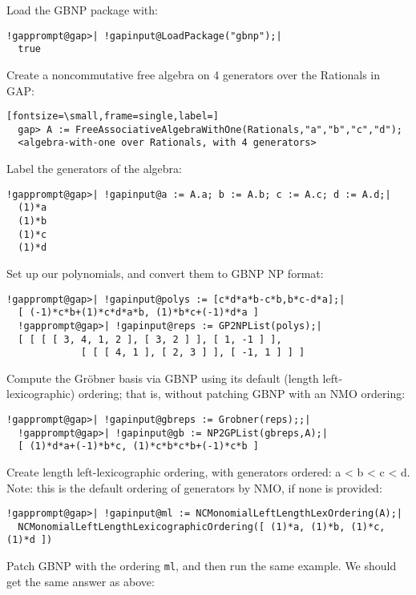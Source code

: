 \documentclass[a4paper,11pt]{report}
\begin{document}
{{{ Load the \textsf{GBNP} package with: 
\begin{Verbatim}[commandchars=!@|,fontsize=\small,frame=single,label=Example]
  !gapprompt@gap>| !gapinput@LoadPackage("gbnp");|
  true
\end{Verbatim}
 Create a noncommutative free algebra on 4 generators over the Rationals in \textsf{GAP}: 
\begin{Verbatim}[fontsize=\small,frame=single,label=]
  gap> A := FreeAssociativeAlgebraWithOne(Rationals,"a","b","c","d");
  <algebra-with-one over Rationals, with 4 generators> 
\end{Verbatim}
 Label the generators of the algebra: 
\begin{Verbatim}[commandchars=!@|,fontsize=\small,frame=single,label=Example]
  !gapprompt@gap>| !gapinput@a := A.a; b := A.b; c := A.c; d := A.d;|
  (1)*a
  (1)*b
  (1)*c
  (1)*d
\end{Verbatim}
 Set up our polynomials, and convert them to \textsf{GBNP} NP format: 
\begin{Verbatim}[commandchars=!@|,fontsize=\small,frame=single,label=Example]
  !gapprompt@gap>| !gapinput@polys := [c*d*a*b-c*b,b*c-d*a];|
  [ (-1)*c*b+(1)*c*d*a*b, (1)*b*c+(-1)*d*a ]
  !gapprompt@gap>| !gapinput@reps := GP2NPList(polys);|
  [ [ [ [ 3, 4, 1, 2 ], [ 3, 2 ] ], [ 1, -1 ] ],
             [ [ [ 4, 1 ], [ 2, 3 ] ], [ -1, 1 ] ] ]
\end{Verbatim}
 Compute the Gr{\"o}bner basis via \textsf{GBNP} using its default (length left-lexicographic) ordering; that is, without
patching \textsf{GBNP} with an \textsf{NMO} ordering: 
\begin{Verbatim}[commandchars=!@|,fontsize=\small,frame=single,label=Example]
  !gapprompt@gap>| !gapinput@gbreps := Grobner(reps);;|
  !gapprompt@gap>| !gapinput@gb := NP2GPList(gbreps,A);|
  [ (1)*d*a+(-1)*b*c, (1)*c*b*c*b+(-1)*c*b ]
\end{Verbatim}
 Create length left-lexicographic ordering, with generators ordered: a
{\textless} b {\textless} c {\textless} d. Note: this is the default ordering
of generators by \textsf{NMO}, if none is provided: 
\begin{Verbatim}[commandchars=!@|,fontsize=\small,frame=single,label=Example]
  !gapprompt@gap>| !gapinput@ml := NCMonomialLeftLengthLexOrdering(A);|
  NCMonomialLeftLengthLexicographicOrdering([ (1)*a, (1)*b, (1)*c, (1)*d ])
\end{Verbatim}
 Patch \textsf{GBNP} with the ordering \texttt{ml}, and then run the same example. We should get the same answer as above: 
}}}
\end{document}
